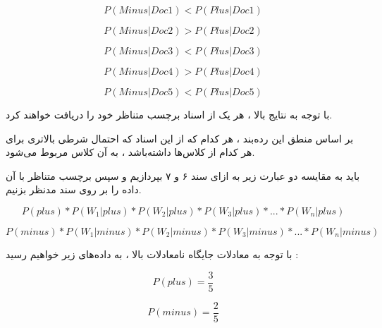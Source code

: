 \begin{boxK}
    \begin{equation*}
        P(Minus | Doc1) < P(Plus | Doc1)
    \end{equation*}

    \begin{equation*}
        P(Minus | Doc2) > P(Plus | Doc2)
    \end{equation*}

    \begin{equation*}
        P(Minus | Doc3) < P(Plus | Doc3)
    \end{equation*}

    \begin{equation*}
        P(Minus | Doc4) > P(Plus | Doc4)
    \end{equation*}

    \begin{equation*}
        P(Minus | Doc5) < P(Plus | Doc5)
    \end{equation*}

\end{boxK}


\begin{boxC}
    با توجه به نتایج بالا ، هر یک از اسناد برچسب متناظر خود را دریافت خواهند کرد.

    بر اساس منطق این رده‌بند ، هر کدام که از این اسناد که احتمال شرطی بالاتری برای هر کدام از کلاس‌ها داشته‌باشد ، به آن کلاس مربوط می‌شود.

    باید به مقایسه دو عبارت زیر به ازای سند ۶ و ۷ بپردازیم و سپس برچسب متناظر با آن داده را بر روی سند مدنظر بزنیم.

    \begin{equation*}
        P(plus) * P(W_{1} | plus) * P(W_{2} | plus) * P(W_{3} | plus) * ... * P(W_{n} | plus)
    \end{equation*}

      \begin{equation*}
        P(minus) * P(W_{1} | minus) * P(W_{2} | minus) * P(W_{3} | minus) * ... * P(W_{n} | minus)
    \end{equation*}

    با توجه به معادلات جایگاه نامعادلات بالا ، به داده‌های زیر خواهیم رسید : 

    \begin{equation*}
        P(plus) = \frac{3}{5}
    \end{equation*}

    \begin{equation*}
        P(minus) = \frac{2}{5}
    \end{equation*}
    
\end{boxC}

